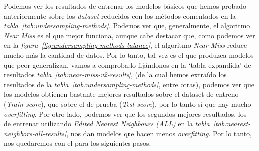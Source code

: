 Podemos ver los resultados de entrenar los modelos básicos que hemos probado anteriormente sobre los \textit{dataset} reducidos con los métodos comentados en la \textit{tabla\ \ref{tab:undersampling-methods}}. Podemos ver que, generalmente, el algoritmo \textit{Near Miss} es el que mejor funciona, aunque cabe destacar que, como podemos ver en la \textit{figura\ \ref{fig:undersampling-methods-balance}}, el algoritmo \textit{Near Miss} reduce mucho más la cantidad de datos. Por lo tanto, tal vez es el que produzca modelos que peor generalizan, vamos a comprobarlo fijándonos en la `tabla expandida' de resultados \textit{tabla\ \ref{tab:near-miss-v2-results}}, (de la cual hemos extraído los resultados de la \textit{tabla\ \ref{tab:undersampling-methods}}, entre otras), podemos ver que los modelos obtienen bastante mejores resultados sobre el dataset de entreno (\textit{Train score}), que sobre el de prueba (\textit{Test score}), por lo tanto sí que hay mucho \textit{overfitting}. Por otro lado, podemos ver que los segundos mejores resultados, los de entrenar utilizando \textit{Edited Nearest Neighbours (ALL)} en la \textit{tabla\ \ref{tab:nearest-neighbors-all-results}}, nos dan modelos que hacen menos \textit{overfitting}. Por lo tanto, nos quedaremos con el para los siguientes pasos. 

\begin{table}[!ht]
    \caption{Resultado de entrenar los modelos básicos sobre el \textit{dataset} reducido con los diferentes métodos. Fuente: propia.}\ \label{tab:undersampling-methods}
\end{table}

